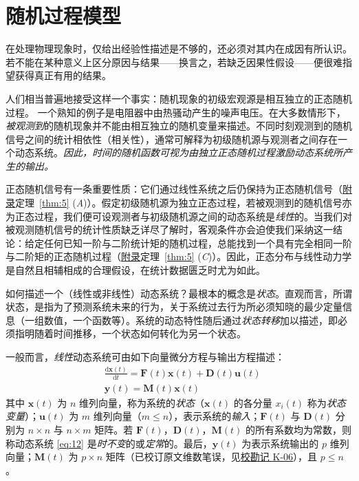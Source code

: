\section{随机过程模型}\label{sec:model}

在处理物理现象时，仅给出经验性描述是不够的，还必须对其内在成因有所认识。若不能在某种意义上区分原因与结果——换言之，若缺乏因果性假设——便很难指望获得真正有用的结果。


人们相当普遍地接受这样一个事实：随机现象的初级宏观源是相互独立的正态随机过程。 一个熟知的例子是电阻器中由热骚动产生的噪声电压。在大多数情形下，\emph{被观测到}的随机现象并不能由相互独立的随机变量来描述。不同时刻观测到的随机信号之间的统计相依性（相关性），通常可解释为初级随机源与观测者之间存在一个动态系统。\emph{因此，时间的随机函数可视为由独立正态随机过程激励动态系统所产生的输出。}

正态随机信号有一条重要性质：它们通过线性系统之后仍保持为正态随机信号（\hyperref[sec:appendix]{附录}定理~\ref{thm:5} (\emph{A})）。假定初级随机源为独立正态过程，若被观测到的随机信号亦为正态过程，我们便可设观测者与初级随机源之间的动态系统是\emph{线性}的。当我们对被观测随机信号的统计性质缺乏详尽了解时，客观条件亦会迫使我们采纳这一结论：给定任何已知一阶与二阶统计矩的随机过程，总能找到一个具有完全相同一阶与二阶矩的正态随机过程（\hyperref[sec:appendix]{附录}定理~\ref{thm:5} (\emph{C})）。因此，正态分布与线性动力学是自然且相辅相成的合理假设，在统计数据匮乏时尤为如此。

如何描述一个（线性或非线性）动态系统？最根本的概念是\emph{状态}。直观而言，所谓状态，是指为了预测系统未来的行为，关于系统过去行为所必须知晓的最少定量信息（一组数值，一个函数等）。系统的动态特性随后通过\emph{状态转移}加以描述，即必须指明随着时间推移，一个状态如何转化为另一个状态。

一般而言，\emph{线性}动态系统可由如下向量微分方程与输出方程描述：
\begin{equation}\label{eq:12}
\begin{aligned}
&\frac{\mathrm{d}\bm{x}(t)}{\mathrm{d}t} = \bm{F}(t)\bm{x}(t) + \bm{D}(t)\bm{u}(t) \\
&\bm{y}(t) = \bm{M}(t)\bm{x}(t)
\end{aligned}
\end{equation}
其中 $\bm{x}(t)$ 为 $n$ 维列向量，称为系统的\emph{状态}（$\bm{x}(t)$ 的各分量 $x_i(t)$ 称为\emph{状态变量}）；$\bm{u}(t)$ 为 $m$ 维列向量（$m \leq n$），表示系统的\emph{输入}；$\bm{F}(t)$ 与 $\bm{D}(t)$ 分别为 $n \times n$ 与 $n \times m$ 矩阵。若 $\bm{F}(t)$，$\bm{D}(t)$，$\bm{M}(t)$ 的所有系数均为常数，则称动态系统 \eqref{eq:12} 是\emph{时不变}的或\emph{定常}的。最后，$\bm{y}(t)$ 为表示系统输出的 $p$ 维列向量；$\bm{M}(t)$ 为 $p \times n$ 矩阵（已校订原文维数笔误，见\hyperref[sec:k06]{校勘记 K-06}），且 $p \leq n$。

